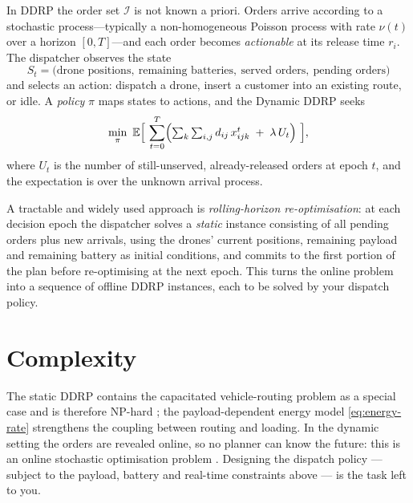 \documentclass[11pt,a4paper]{article}
\newcommand{\E}{\mathbb{E}}
\begin{document}
In DDRP the order set $\mathcal{I}$ is not known a priori. Orders arrive
according to a stochastic process---typically a non-homogeneous Poisson process
with rate $\nu(t)$ over a horizon $[0,T]$---and each order becomes
\emph{actionable} at its release time $r_{i}$. The dispatcher observes the state
\begin{equation}
  S_{t} = \bigl(\text{drone positions},\ \text{remaining batteries},\
          \text{served orders},\ \text{pending orders}\bigr)
\end{equation}
and selects an action: dispatch a drone, insert a customer into an existing
route, or idle. A \emph{policy} $\pi$ maps states to actions, and the Dynamic
DDRP seeks
\begin{equation}
  \min_{\pi} \ \E\Bigl[ \ \sum_{t=0}^{T}
      \Bigl( \textstyle\sum_{k}\sum_{i,j} d_{ij}\,x_{ijk}^{t}
             \;+\; \lambda\, U_{t} \Bigr) \ \Bigr],
  \label{eq:ddrp-dynamic}
\end{equation}
where $U_{t}$ is the number of still-unserved, already-released orders at epoch
$t$, and the expectation is over the unknown arrival process.

A tractable and widely used approach is \emph{rolling-horizon
re-optimisation}: at each decision epoch the dispatcher solves a \emph{static}
instance consisting of all pending orders plus new arrivals, using the drones'
current positions, remaining payload and remaining battery as initial
conditions, and commits to the first portion of the plan before re-optimising
at the next epoch. This turns the online problem into a sequence of offline
DDRP instances, each to be solved by your dispatch policy.

\section{Complexity}

The static DDRP contains the capacitated vehicle-routing problem as a special
case and is therefore NP-hard \cite{toth2014}; the payload-dependent energy model
\eqref{eq:energy-rate} strengthens the coupling between routing and loading. In
the dynamic setting the orders are revealed online, so no planner can know the
future: this is an online stochastic optimisation problem \cite{psaraftis1995}.
Designing the dispatch policy --- subject to the payload, battery and real-time
constraints above --- is the task left to you.
\end{document}
